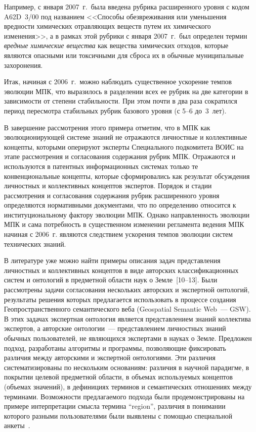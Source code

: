 \begin{multicols}{2}
   Например, с января 2007~г.\ была введена рубрика расширенного уровня с кодом
A62D~3/00 под названием <<Способы обезвреживания или уменьшения вредности
химических отравляющих веществ путем их химического изменения>>, а в рамках этой
рубрики с января 2007~г.\ был определен термин \textit{вредные химические вещества} как
вещества химических отходов, которые являются опасными или токсичными для сброса их в
обычные муниципальные захоронения.

   Итак, начиная с 2006~г.\ можно наблюдать существенное ускорение темпов эволюции
МПК, что выразилось в разделении всех ее рубрик на две категории в зависимости от
степени стабильности. При этом почти в два раза сократился период пересмотра стабильных
рубрик базового уровня (с 5--6 до~3~лет).

   В завершение рассмотрения этого примера отметим, что в МПК как эволюционирующей
системе знаний не отражаются личностные и коллективные концепты, которыми оперируют
эксперты Специального подкомитета ВОИС на этапе рас\-смот\-ре\-ния и согласования
содержания рубрик МПК. Отражаются и используются в патентных информационных
системах только те конвенциональные кон\-цеп\-ты, которые сформировались как результат %
обсужде\-ния личностных и коллективных концептов экспертов. Порядок и стадии
рассмотрения и согласования содержания рубрик расширенного уровня определяются
нормативными документами, что по определению относится к институциональному фактору
эволюции МПК. Однако направленность эволюции МПК и сама потребность в
существенном изменении регламента ведения МПК начиная с 2006~г. являются следствием
ускорения темпов эволюции систем технических знаний.

   В литературе уже можно найти примеры описания задач представления личностных и
коллективных концептов в виде авторских классификационных систем и онтологий в
предметной области наук о Земле~[10--13]. Были рассмотрены задачи
согласования нескольких авторских и экспертной онтологий, результаты решения которых
предлагается использовать в процессе создания Геопространственного семантического веба
(Geospatial Semantic Web~--- GSW). В этих задачах экспертная онтология является
представлением знаний коллектива экспертов, а авторские онтологии~--- представлением
личностных знаний обычных пользователей, не являющихся экспертами в науках о Земле.
Предложен подход, разработаны алгоритмы и программы, позволяющие фиксировать
различия между авторскими и экспертной онтологиями. Эти различия систематизированы по
нескольким основаниям: различия в научной парадигме, в покрытии целевой предметной
области, в объемах используемых концептов (объемах значений), в дефинициях терминов и
семантических отношениях между терминами. Возможности предлагаемого подхода были
продемонстрированы на примере интерпретации смысла термина ``region'', различия в
понимании которого разными пользователями были выявлены с помощью специальной
анкеты~\cite{12za, 13za}.


\end{multicols}
